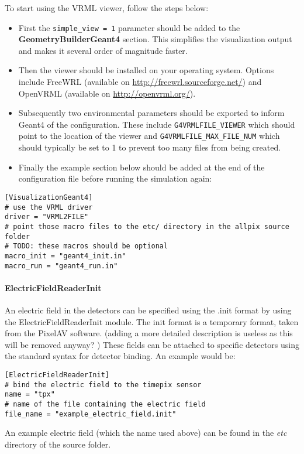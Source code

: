 To start using the VRML viewer, follow the steps below:
\begin{itemize}
\item First the \texttt{simple\_view = 1} parameter should be added to the \textbf{GeometryBuilderGeant4} section. This simplifies the visualization output and makes it several order of magnitude faster. 
\item Then the viewer should be installed on your operating system. Options include FreeWRL (available on \url{http://freewrl.sourceforge.net/}) and OpenVRML (available on \url{http://openvrml.org/}).
\item Subsequently two environmental parameters should be exported to inform Geant4 of the configuration. These include \texttt{G4VRMLFILE\_VIEWER} which should point to the location of the viewer and \texttt{G4VRMLFILE\_MAX\_FILE\_NUM} which should typically be set to 1 to prevent too many files from being created.
\item Finally the example section below should be added at the end of the configuration file before running the simulation again:
\end{itemize}

\begin{verbatim}
[VisualizationGeant4]
# use the VRML driver
driver = "VRML2FILE" 
# point those macro files to the etc/ directory in the allpix source folder
# TODO: these macros should be optional
macro_init = "geant4_init.in"
macro_run = "geant4_run.in"
\end{verbatim}

\paragraph{ElectricFieldReaderInit}
An electric field in the detectors can be specified using the .init format by using the ElectricFieldReaderInit module. The init format is a temporary format, taken from the PixelAV software\cite{pixelavgit}. (\todo adding a more detailed description is useless as this will be removed anyway? \todo) These fields can be attached to specific detectors using the standard syntax for detector binding. An example would be:
\begin{verbatim}
[ElectricFieldReaderInit]
# bind the electric field to the timepix sensor
name = "tpx"
# name of the file containing the electric field
file_name = "example_electric_field.init"
\end{verbatim}
An example electric field (which the name used above) can be found in the \textit{etc} directory of the \apsq source folder.

